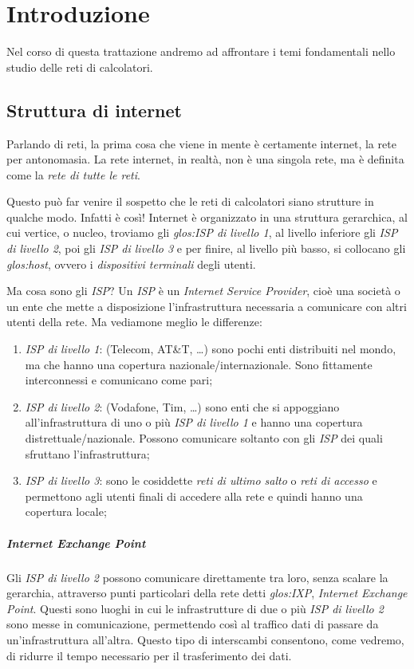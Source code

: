 \chapter{Introduzione}
Nel corso di questa trattazione andremo ad affrontare i temi fondamentali nello
studio delle reti di calcolatori.

\section{Struttura di internet}
Parlando di reti, la prima cosa che viene in mente è certamente internet, la rete
per antonomasia. La rete internet, in realtà, non è una singola rete, ma è
definita come la \emph{rete di tutte le reti}.

Questo può far venire il sospetto che le reti di calcolatori siano strutture in
qualche modo. Infatti è così! Internet è organizzato in una struttura
gerarchica, al cui vertice, o nucleo, troviamo gli \emph{\gls{glos:ISP} di
livello 1}, al livello inferiore gli \emph{ISP di livello 2}, poi gli \emph{ISP
di livello 3} e per finire, al livello più basso, si collocano gli
\emph{\gls{glos:host}}, ovvero i \emph{dispositivi terminali} degli utenti.

Ma cosa sono gli \emph{ISP}? Un \emph{ISP} è un \emph{Internet Service Provider},
cioè una società o un ente che mette a disposizione l'infrastruttura necessaria
a comunicare con altri utenti della rete. Ma vediamone meglio le differenze:
\begin{enumerate}
    \item \emph{ISP di livello 1}: (Telecom, AT\&T, \dots) sono pochi enti
    distribuiti nel mondo, ma che hanno una copertura nazionale/internazionale.
    Sono fittamente interconnessi e comunicano come pari;
    \item \emph{ISP di livello 2}: (Vodafone, Tim, \dots) sono enti che si
    appoggiano all'infrastruttura di uno o più \emph{ISP di livello 1} e hanno
    una copertura distrettuale/nazionale. Possono comunicare soltanto con gli
    \emph{ISP} dei quali sfruttano l'infrastruttura;
    \item \emph{ISP di livello 3}: sono le cosiddette \emph{reti di ultimo
    salto} o \emph{reti di accesso} e permettono agli utenti finali di accedere
    alla rete e quindi hanno una copertura locale;
\end{enumerate}

\paragraph{Internet Exchange Point}
Gli \emph{ISP di livello 2} possono comunicare direttamente tra loro, senza scalare
la gerarchia, attraverso punti particolari della rete detti \emph{\gls{glos:IXP}},
\emph{Internet Exchange Point}. Questi sono luoghi in cui le infrastrutture di
due o più \emph{ISP di livello 2} sono messe in comunicazione, permettendo così
al traffico dati di passare da un'infrastruttura all'altra. Questo tipo di
interscambi consentono, come vedremo, di ridurre il tempo necessario per il
trasferimento dei dati.

